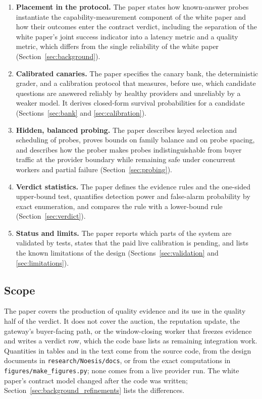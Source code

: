 \begin{enumerate}
  \item \textbf{Placement in the protocol.} The paper states how known-answer
    probes instantiate the capability-measurement component of the white
    paper and how their outcomes enter the contract verdict, including the
    separation of the white paper's joint success indicator into a latency
    metric and a quality metric, which differs from the single reliability of
    the white paper (Section~\ref{sec:background}).

  \item \textbf{Calibrated canaries.} The paper specifies the canary bank, the
    deterministic grader, and a calibration protocol that measures, before use,
    which candidate questions are answered reliably by healthy providers and
    unreliably by a weaker model. It derives closed-form survival
    probabilities for a candidate (Sections~\ref{sec:bank} and
    \ref{sec:calibration}).

  \item \textbf{Hidden, balanced probing.} The paper describes keyed
    selection and scheduling of probes, proves bounds on family balance and on
    probe spacing, and describes how the prober makes probes indistinguishable
    from buyer traffic at the provider boundary while remaining safe under
    concurrent workers and partial failure (Section~\ref{sec:probing}).

  \item \textbf{Verdict statistics.} The paper defines the evidence rules and
    the one-sided upper-bound test, quantifies detection power and false-alarm
    probability by exact enumeration, and compares the rule with a lower-bound
    rule (Section~\ref{sec:verdict}).

  \item \textbf{Status and limits.} The paper reports which parts of the
    system are validated by tests, states that the paid live calibration is
    pending, and lists the known limitations of the design
    (Sections~\ref{sec:validation} and \ref{sec:limitations}).
\end{enumerate}

\subsection{Scope}
\label{sec:scope}

The paper covers the production of quality evidence and its use in the quality
half of the verdict. It does not cover the auction, the reputation update, the
gateway's buyer-facing path, or the window-closing worker that freezes evidence
and writes a verdict row, which the code base lists as remaining integration
work. Quantities in tables and in the text come from the source code, from the
design documents in \texttt{research/Noesis/docs}, or from the exact
computations in \texttt{figures/make\_figures.py}; none comes from a live
provider run. The white paper's contract model changed after the code was
written; Section~\ref{sec:background_refinements} lists the differences.


